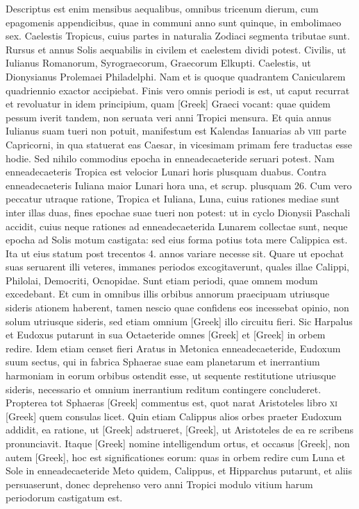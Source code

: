 Descriptus est enim mensibus aequalibus,
omnibus tricenum dierum, cum epagomenis appendicibus, quae
in communi anno sunt quinque, in embolimaeo sex.
Caelestis Tropicus,
cuius partes in naturalia Zodiaci segmenta tributae sunt.
Rursus
et annus Solis aequabilis in civilem et caelestem dividi potest.
Civilis,
ut Iulianus Romanorum, Syrograecorum, Graecorum Elkupti.
Caelestis,
ut Dionysianus Prolemaei Philadelphi.
Nam et is quoque quadrantem
Canicularem quadriennio exactor accipiebat.
Finis vero
omnis periodi is est, ut caput recurrat et revoluatur in idem principium,
quam \textgreek{[Greek]} Graeci vocant: quae quidem pessum iverit tandem,
non seruata veri anni Tropici mensura.
Et quia annus Iulianus
suam tueri non potuit, manifestum est Kalendas Ianuarias ab \textsc{viii}
parte Capricorni, in qua statuerat eas Caesar, in vicesimam primam
fere traductas esse hodie.
Sed nihilo commodius epocha in enneadecaeteride
seruari potest.
Nam enneadecaeteris Tropica est velocior
Lunari horis plusquam duabus.
Contra enneadecaeteris Iuliana
maior Lunari hora una, et scrup. plusquam 26.
Cum vero peccatur
utraque ratione, Tropica et Iuliana, Luna, cuius rationes mediae sunt
inter illas duas, fines epochae suae tueri non potest: ut in cyclo Dionysii
Paschali accidit, cuius neque rationes ad enneadecaeterida Lunarem
collectae sunt, neque epocha ad Solis motum castigata: sed eius
forma potius tota mere Calippica est.
Ita ut eius statum post trecentos
4. annos variare necesse sit.
Quare ut epochat suas seruarent illi veteres,
immanes periodos excogitaverunt, quales illae Calippi, Philolai, Democriti,
Ocnopidae.
Sunt etiam periodi, quae omnem modum excedebant.
Et cum in omnibus illis orbibus annorum praecipuam
utriusque sideris ationem haberent, tamen nescio quae confidens eos
incessebat opinio, non solum utriusque sideris, sed etiam omnium
\textgreek{[Greek]} illo circuitu fieri.
Sic Harpalus et Eudoxus putarunt
in sua Octaeteride omnes \textgreek{[Greek]}
 et \textgreek{[Greek]} in orbem redire.
Idem etiam censet fieri Aratus in Metonica enneadecaeteride, Eudoxum
suum sectus, qui in fabrica Sphaerae suae eam planetarum et inerrantium
harmoniam in eorum orbibus ostendit esse, ut sequente
restitutione utriusque sideris, necessario et omnium inerrantium reditum
contingere concluderet.
Propterea tot Sphaeras \textgreek{[Greek]} commentus
est, quot narat Aristoteles libro \textsc{xi} \textgreek{[Greek]} quem
consulas licet.
Quin etiam Calippus alios orbes praeter Eudoxum
addidit, ea ratione, ut \textgreek{[Greek]} adstrueret,
 \textgreek{[Greek]},
ut Aristoteles de ea re scribens pronunciavit.
Itaque \textgreek{[Greek]} nomine intelligendum ortus,
 et occasus \textgreek{[Greek]},
non autem \textgreek{[Greek]}, hoc est significationes
eorum: quas in orbem redire cum Luna et Sole in enneadecaeteride
Meto quidem, Calippus, et Hipparchus putarunt, et aliis
persuaserunt, donec deprehenso vero anni Tropici modulo vitium
harum periodorum castigatum est.

